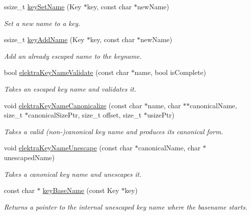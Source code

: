 \begin{DoxyCompactItemize}
ssize\+\_\+t \hyperlink{group__keyname_ga7699091610e7f3f43d2949514a4b35d9}{key\+Set\+Name} (Key $\ast$key, const char $\ast$new\+Name)
\begin{DoxyCompactList}\small\item\em Set a new name to a key. \end{DoxyCompactList}\item 
ssize\+\_\+t \hyperlink{group__keyname_gaa70593a2c772c4b7bc33423b9b10a270}{key\+Add\+Name} (Key $\ast$key, const char $\ast$new\+Name)
\begin{DoxyCompactList}\small\item\em Add an already escaped name to the keyname. \end{DoxyCompactList}\item 
bool \hyperlink{group__keyname_ga26bacb092ebca8f69f3fee72069733d8}{elektra\+Key\+Name\+Validate} (const char $\ast$name, bool is\+Complete)
\begin{DoxyCompactList}\small\item\em Takes an escaped key name and validates it. \end{DoxyCompactList}\item 
void \hyperlink{group__keyname_ga99ef3765a0ea0887c8ab72859ae2592e}{elektra\+Key\+Name\+Canonicalize} (const char $\ast$name, char $\ast$$\ast$canonical\+Name, size\+\_\+t $\ast$canonical\+Size\+Ptr, size\+\_\+t offset, size\+\_\+t $\ast$usize\+Ptr)
\begin{DoxyCompactList}\small\item\em Takes a valid (non-\/)canonical key name and produces its canonical form. \end{DoxyCompactList}\item 
void \hyperlink{group__keyname_ga85dd2a5169e900c6c8371c54c7944edb}{elektra\+Key\+Name\+Unescape} (const char $\ast$canonical\+Name, char $\ast$unescaped\+Name)
\begin{DoxyCompactList}\small\item\em Takes a canonical key name and unescapes it. \end{DoxyCompactList}\item 
const char $\ast$ \hyperlink{group__keyname_gaaff35e7ca8af5560c47e662ceb9465f5}{key\+Base\+Name} (const Key $\ast$key)
\begin{DoxyCompactList}\small\item\em Returns a pointer to the internal unescaped key name where the {\ttfamily basename} starts. \end{DoxyCompactList}\item 
$$
\end{DoxyCompactItemize}
